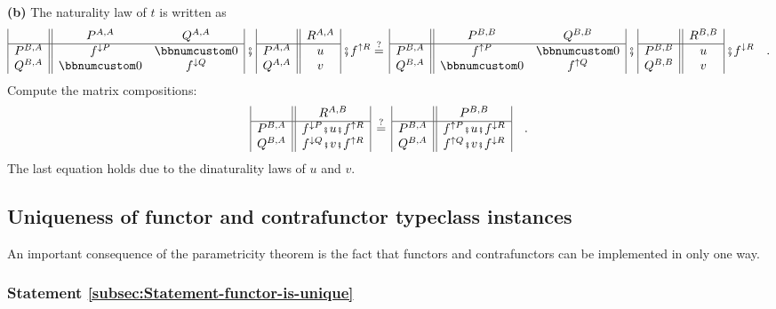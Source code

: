 \textbf{(b)} The naturality law of $t$ is written as
\[
\begin{array}{|c||cc|}
 & P^{A,A} & Q^{A,A}\\
\hline P^{B,A} & f^{\downarrow P} & \bbnum 0\\
Q^{B,A} & \bbnum 0 & f^{\downarrow Q}
\end{array}\,\bef\,\begin{array}{|c||c|}
 & R^{A,A}\\
\hline P^{A,A} & u\\
Q^{A,A} & v
\end{array}\,\bef f^{\uparrow R}\overset{?}{=}\,\begin{array}{|c||cc|}
 & P^{B,B} & Q^{B,B}\\
\hline P^{B,A} & f^{\uparrow P} & \bbnum 0\\
Q^{B,A} & \bbnum 0 & f^{\uparrow Q}
\end{array}\,\bef\,\begin{array}{|c||c|}
 & R^{B,B}\\
\hline P^{B,B} & u\\
Q^{B,B} & v
\end{array}\,\bef f^{\downarrow R}\quad.
\]
Compute the matrix compositions:
\[
\begin{array}{|c||c|}
 & R^{A,B}\\
\hline P^{B,A} & f^{\downarrow P}\bef u\bef f^{\uparrow R}\\
Q^{B,A} & f^{\downarrow Q}\bef v\bef f^{\uparrow R}
\end{array}\,\overset{?}{=}\,\begin{array}{|c||c|}
 & P^{B,B}\\
\hline P^{B,A} & f^{\uparrow P}\bef u\bef f^{\downarrow R}\\
Q^{B,A} & f^{\uparrow Q}\bef v\bef f^{\downarrow R}
\end{array}\quad.
\]
The last equation holds due to the dinaturality laws of $u$ and $v$.

\subsection{Uniqueness of functor and contrafunctor typeclass instances\label{sec:Uniqueness-of-functor-and-contrafunctor}}

An important consequence of the parametricity theorem is the fact
that functors and contrafunctors can be implemented in only one way.

\subsubsection{Statement \label{subsec:Statement-functor-is-unique}\ref{subsec:Statement-functor-is-unique}}

